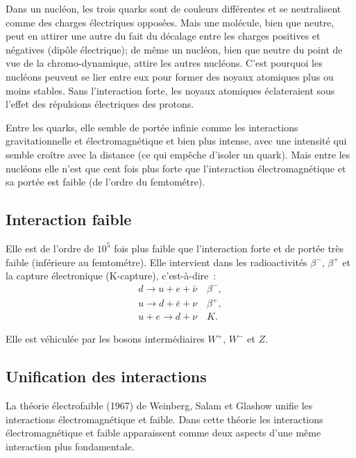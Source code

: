 Dans un nucléon, les trois quarks sont de couleurs différentes et se
neutralisent comme des charges électriques opposées. Mais une molécule, bien
que neutre, peut en attirer une autre du fait du décalage entre les charges
positives et négatives (dipôle électrique); de même un nucléon, bien que
neutre du point de vue de la chromo-dynamique, attire les autres nucléons.
C'est pourquoi les nucléons peuvent se lier entre eux pour former des noyaux
atomiques plus ou moins stables. Sans l'interaction forte, les noyaux
atomiques éclateraient sous l'effet des répulsions électriques des protons.

Entre les quarks, elle semble de portée infinie comme les interactions
gravitationnelle et électromagnétique et bien plus intense, avec une intensité
qui semble croître avec la distance (ce qui empêche d'isoler un quark). Mais
entre les nucléons elle n'est que cent fois plus forte que l'interaction
électromagnétique et sa portée est faible (de l'ordre du femtométre).

\subsection{Interaction faible}
\label{chap2-subsec:interactionfaible}

Elle est de l'ordre de $10^5$ fois plus faible que l'interaction forte et de
portée très faible (inférieure au femtométre). Elle intervient dans les
radioactivités $\beta^-$, $\beta^+$ et la capture électronique (K-capture),
c'est-à-dire~:
\begin{align} 
  d \rightarrow u + e + \bar{\nu} \quad \beta^{-},\\
  u \rightarrow d + \bar{e} + \nu \quad \beta^{+}, \\
  u+e \rightarrow d + \nu \quad  K.
\end{align}

Elle est véhiculée par les bosons intermédiaires $W^+$, $W^-$ et $Z$.

\subsection{Unification des interactions}
\label{chap2-subsec:unification}

La théorie électrofaible (1967) de Weinberg, Salam et Glashow unifie les
interactions électromagnétique et faible. Dans cette théorie les interactions
électromagnétique et faible apparaissent comme deux aspects d'une même
interaction plus fondamentale.

